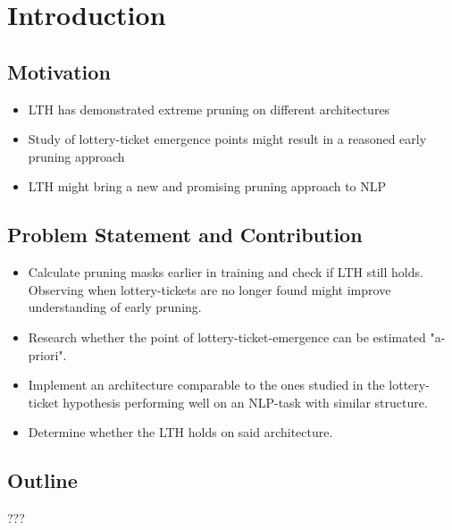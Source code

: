 \chapter{Introduction}

\section{Motivation}
\begin{itemize}
	\item LTH has demonstrated extreme pruning on different architectures
	\item Study of lottery-ticket emergence points might result in a reasoned early pruning approach
	\item LTH might bring a new and promising pruning approach to NLP
\end{itemize}

\section{Problem Statement and Contribution}
\begin{itemize}
	\item 
		Calculate pruning masks earlier in training and check if LTH still holds.\\
		Observing when lottery-tickets are no longer found might improve understanding of early pruning.
	\item Research whether the point of lottery-ticket-emergence can be estimated "a-priori". 
	\item 
		Implement an architecture comparable to the ones studied in the lottery-ticket hypothesis performing well on an NLP-task with similar structure.
	\item Determine whether the LTH holds on said architecture.
	
\end{itemize}

\section{Outline}
???